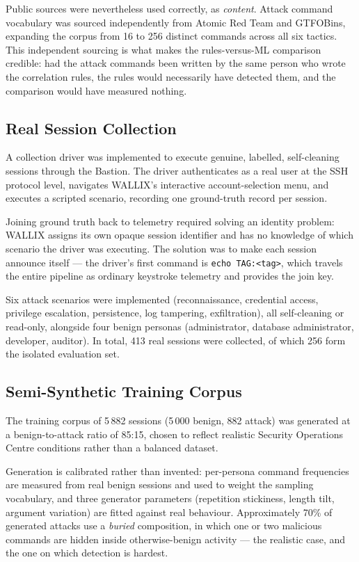 \documentclass{classeENS}
\begin{document}
Public sources were nevertheless used correctly, as \emph{content}. Attack command vocabulary was sourced independently from Atomic Red Team and GTFOBins, expanding the corpus from 16 to 256 distinct commands across all six tactics. This independent sourcing is what makes the rules-versus-ML comparison credible: had the attack commands been written by the same person who wrote the correlation rules, the rules would necessarily have detected them, and the comparison would have measured nothing.

\subsection{Real Session Collection}
A collection driver was implemented to execute genuine, labelled, self-cleaning sessions through the Bastion. The driver authenticates as a real user at the SSH protocol level, navigates WALLIX's interactive account-selection menu, and executes a scripted scenario, recording one ground-truth record per session.

Joining ground truth back to telemetry required solving an identity problem: WALLIX assigns its own opaque session identifier and has no knowledge of which scenario the driver was executing. The solution was to make each session announce itself --- the driver's first command is \texttt{echo TAG:<tag>}, which travels the entire pipeline as ordinary keystroke telemetry and provides the join key.

Six attack scenarios were implemented (reconnaissance, credential access, privilege escalation, persistence, log tampering, exfiltration), all self-cleaning or read-only, alongside four benign personas (administrator, database administrator, developer, auditor). In total, 413 real sessions were collected, of which 256 form the isolated evaluation set.

\subsection{Semi-Synthetic Training Corpus}
The training corpus of 5\,882 sessions (5\,000 benign, 882 attack) was generated at a benign-to-attack ratio of 85:15, chosen to reflect realistic Security Operations Centre conditions rather than a balanced dataset.

Generation is calibrated rather than invented: per-persona command frequencies are measured from real benign sessions and used to weight the sampling vocabulary, and three generator parameters (repetition stickiness, length tilt, argument variation) are fitted against real behaviour. Approximately 70\% of generated attacks use a \emph{buried} composition, in which one or two malicious commands are hidden inside otherwise-benign activity --- the realistic case, and the one on which detection is hardest.
\end{document}
